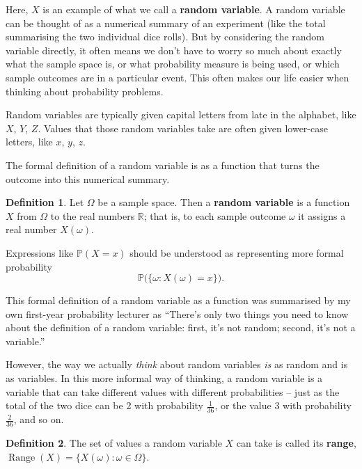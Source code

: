 \documentclass[
  a4paper,
]{book}
\theoremstyle{definition}
\newtheorem{definition}{Definition}[chapter]
\theoremstyle{definition}
\theoremstyle{definition}
\theoremstyle{definition}
\theoremstyle{remark}
\begin{document}
Here, \(X\) is an example of what we call a \textbf{random variable}. A random variable can be thought of as a numerical summary of an experiment (like the total summarising the two individual dice rolls). But by considering the random variable directly, it often means we don't have to worry so much about exactly what the sample space is, or what probability measure is being used, or which sample outcomes are in a particular event. This often makes our life easier when thinking about probability problems.

Random variables are typically given capital letters from late in the alphabet, like \(X\), \(Y\), \(Z\). Values that those random variables take are often given lower-case letters, like \(x\), \(y\), \(z\).

The formal definition of a random variable is as a function that turns the outcome into this numerical summary.

\begin{definition}
Let \(\Omega\) be a sample space. Then a \textbf{random variable} is a function \(X\) from \(\Omega\) to the real numbers \(\mathbb R\); that is, to each sample outcome \(\omega\) it assigns a real number \(X(\omega)\).

Expressions like \(\mathbb P(X = x)\) should be understood as representing more formal probability
\[ \mathbb P \big( \{\omega : X(\omega) = x \}\big) . \]
\end{definition}

This formal definition of a random variable as a function was summarised by my own first-year probability lecturer as ``There's only two things you need to know about the definition of a random variable: first, it's not random; second, it's not a variable.''

However, the way we actually \emph{think} about random variables \emph{is} as random and is as variables. In this more informal way of thinking, a random variable is a variable that can take different values with different probabilities -- just as the total of the two dice can be 2 with probability \(\frac{1}{36}\), or the value 3 with probability \(\frac{2}{36}\), and so on.

\newcommand{\Range}{\operatorname{Range}}

\begin{definition}
The set of values a random variable \(X\) can take is called its \textbf{range}, \(\operatorname{Range}(X) = \{X(\omega) : \omega \in \Omega \}\).
\end{definition}
\end{document}
